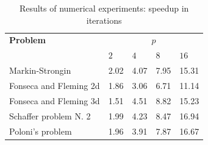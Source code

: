 \documentclass{llncs}
\begin{document}
\begin{table}
  \centering
  \caption{Results of numerical experiments: speedup in iterations}
  \label{tab:exResultsItersSpeedup}
  \begin{tabular}{|l|K{1.5cm}|K{1.5cm}|K{1.5cm}|K{1.5cm}|}
\hline
\textbf{Problem} & \\
  & \(2\) & \(4\) & \(8\) & \(16\)\\
\hline
Markin-Strongin & 2.02 & 4.07 & 7.95 & 15.31 \\
\hline
Fonseca and Fleming 2d & 1.86 & 3.06 & 6.71 & 11.14 \\
\hline
Fonseca and Fleming 3d & 1.51 & 4.51 & 8.82 & 15.23 \\
\hline
Schaffer problem N. 2 & 1.99 & 4.23 & 8.47 & 16.94\\
\hline
Poloni's problem & 1.96 & 3.91 & 7.87 & 16.67 \\
\hline
\end{tabular}
\end{table}
\end{document}
